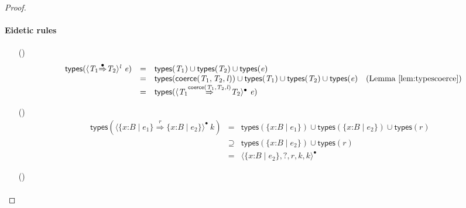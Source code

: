 \documentclass[9pt]{extarticle}
\newcommand{\ottnt}[1]{\mathit{#1}}
\begin{document}
\begin{lemma}
\begin{proof}
{    \paragraph{Eidetic \lambdah rules}
\begin{itemize}
    \item[(\E{Coerce})] \[ \begin{array}{rclr}
         \mathsf{types} (  \langle  \ottnt{T_{{\mathrm{1}}}}  \mathord{ \overset{\bullet}{\Rightarrow} }  \ottnt{T_{{\mathrm{2}}}}  \rangle^{ \ottnt{l} } ~  \ottnt{e}  )  &=&    \mathsf{types} ( \ottnt{T_{{\mathrm{1}}}} )   \cup   \mathsf{types} ( \ottnt{T_{{\mathrm{2}}}} )    \cup   \mathsf{types} ( \ottnt{e} )   & \\
        &=&     \mathsf{types} (  \mathsf{coerce} ( \ottnt{T_{{\mathrm{1}}}} , \ottnt{T_{{\mathrm{2}}}} , \ottnt{l} )  )   \cup   \mathsf{types} ( \ottnt{T_{{\mathrm{1}}}} )    \cup   \mathsf{types} ( \ottnt{T_{{\mathrm{2}}}} )    \cup   \mathsf{types} ( \ottnt{e} )   & \text{(Lemma~\ref{lem:typescoerce})} \\
        &=&  \mathsf{types} (  \langle  \ottnt{T_{{\mathrm{1}}}}  \mathord{ \overset{  \mathsf{coerce} ( \ottnt{T_{{\mathrm{1}}}} , \ottnt{T_{{\mathrm{2}}}} , \ottnt{l} )  }{\Rightarrow} }  \ottnt{T_{{\mathrm{2}}}}  \rangle^{\bullet} ~  \ottnt{e}  )  &
      \end{array} \]
    \item[(\E{CoerceStack})] \[ \begin{array}{rclr}
         \mathsf{types} (  \langle   \{ \mathit{x} \mathord{:} \ottnt{B} \mathrel{\mid} \ottnt{e_{{\mathrm{1}}}} \}   \mathord{ \overset{ \ottnt{r} }{\Rightarrow} }   \{ \mathit{x} \mathord{:} \ottnt{B} \mathrel{\mid} \ottnt{e_{{\mathrm{2}}}} \}   \rangle^{\bullet} ~  \ottnt{k}  )  &=&    \mathsf{types} (  \{ \mathit{x} \mathord{:} \ottnt{B} \mathrel{\mid} \ottnt{e_{{\mathrm{1}}}} \}  )   \cup   \mathsf{types} (  \{ \mathit{x} \mathord{:} \ottnt{B} \mathrel{\mid} \ottnt{e_{{\mathrm{2}}}} \}  )    \cup   \mathsf{types} ( \ottnt{r} )   & \\
        &\supseteq&   \mathsf{types} (  \{ \mathit{x} \mathord{:} \ottnt{B} \mathrel{\mid} \ottnt{e_{{\mathrm{2}}}} \}  )   \cup   \mathsf{types} ( \ottnt{r} )   & \\
        &=&  \langle   \{ \mathit{x} \mathord{:} \ottnt{B} \mathrel{\mid} \ottnt{e_{{\mathrm{2}}}} \}  ,   \mathord{?}  ,  \ottnt{r} ,  \ottnt{k} ,  \ottnt{k}  \rangle^{\bullet}  &
      \end{array} \]
    \item[(\E{StackDone})] \[ \begin{array}{rclr}

\end{array}\]
\end{itemize}}
\end{proof}
\end{lemma}
\end{document}
